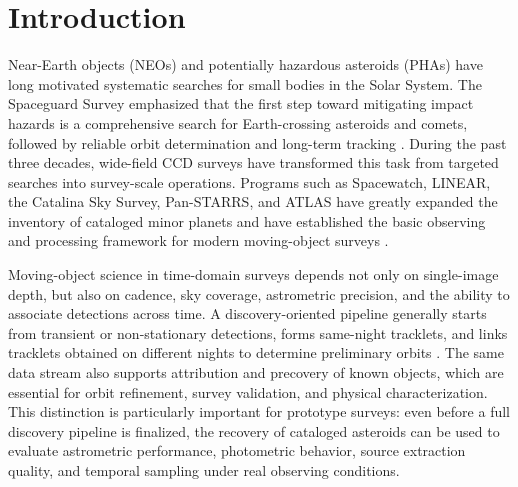 \documentclass[referee]{raa}
\begin{document}

\maketitle

\section{Introduction}
\label{sec:intro}

Near-Earth objects (NEOs) and potentially hazardous asteroids (PHAs) have long motivated systematic searches for small bodies in the Solar System. The Spaceguard Survey emphasized that the first step toward mitigating impact hazards is a comprehensive search for Earth-crossing asteroids and comets, followed by reliable orbit determination and long-term tracking \citep{Morrison1992}. During the past three decades, wide-field CCD surveys have transformed this task from targeted searches into survey-scale operations. Programs such as Spacewatch, LINEAR, the Catalina Sky Survey, Pan-STARRS, and ATLAS have greatly expanded the inventory of cataloged minor planets and have established the basic observing and processing framework for modern moving-object surveys \citep[e.g.][]{Stokes2000,Larsen2007,Drake2009,Denneau2013,Tonry2018}.

Moving-object science in time-domain surveys depends not only on single-image depth, but also on cadence, sky coverage, astrometric precision, and the ability to associate detections across time. A discovery-oriented pipeline generally starts from transient or non-stationary detections, forms same-night tracklets, and links tracklets obtained on different nights to determine preliminary orbits \citep{Kubica2007,Denneau2013,Veres2017}. The same data stream also supports attribution and precovery of known objects, which are essential for orbit refinement, survey validation, and physical characterization. This distinction is particularly important for prototype surveys: even before a full discovery pipeline is finalized, the recovery of cataloged asteroids can be used to evaluate astrometric performance, photometric behavior, source extraction quality, and temporal sampling under real observing conditions.
\end{document}
